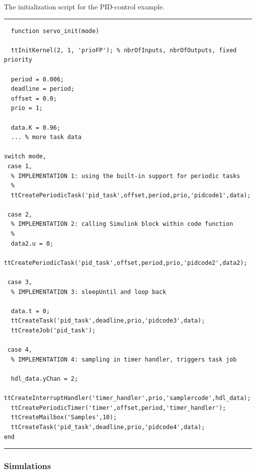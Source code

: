\documentclass[final,twoside]{rapport}
\begin{document}
\begin{listing}[b]\small
\caption{The initialization script for the PID-control example.}
\label{list:servoinit}
\vspace{3mm}
\hrule
\begin{verbatim}
  function servo_init(mode)

  ttInitKernel(2, 1, 'prioFP'); % nbrOfInputs, nbrOfOutputs, fixed priority

  period = 0.006;
  deadline = period;
  offset = 0.0; 
  prio = 1;

  data.K = 0.96;
  ... % more task data

switch mode,
 case 1, 
  % IMPLEMENTATION 1: using the built-in support for periodic tasks
  % 
  ttCreatePeriodicTask('pid_task',offset,period,prio,'pidcode1',data);

 case 2, 
  % IMPLEMENTATION 2: calling Simulink block within code function 
  %
  data2.u = 0; 
  ttCreatePeriodicTask('pid_task',offset,period,prio,'pidcode2',data2);

 case 3, 
  % IMPLEMENTATION 3: sleepUntil and loop back
  
  data.t = 0;
  ttCreateTask('pid_task',deadline,prio,'pidcode3',data);
  ttCreateJob('pid_task');

 case 4, 
  % IMPLEMENTATION 4: sampling in timer handler, triggers task job
  
  hdl_data.yChan = 2;
  ttCreateInterruptHandler('timer_handler',prio,'samplercode',hdl_data);
  ttCreatePeriodicTimer('timer',offset,period,'timer_handler');
  ttCreateMailbox('Samples',10);
  ttCreateTask('pid_task',deadline,prio,'pidcode4',data);
end
\end{verbatim}
\hrule
\end{listing}

\subsubsection{Simulations}
\end{document}
